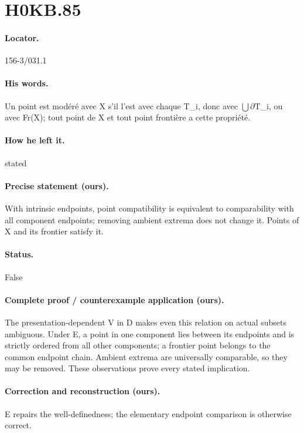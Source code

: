 \section*{H0KB.85}\label{statement:H0KB.85}
\paragraph{Locator.} 156-3/031.1

\paragraph{His words.} Un point est modéré avec X s’il l’est avec chaque T\_i, donc avec \ensuremath{\bigcup}\ensuremath{\partial}T\_i, ou avec Fr(X); tout point de X et tout point frontière a cette propriété.

\paragraph{How he left it.} stated

\paragraph{Precise statement (ours).} With intrinsic endpoints, point compatibility is equivalent to comparability with all component endpoints; removing ambient extrema does not change it. Points of X and its frontier satisfy it.

\paragraph{Status.} False

\paragraph{Complete proof / counterexample application (ours).} The presentation-dependent V in D makes even this relation on actual subsets ambiguous. Under E, a point in one component lies between its endpoints and is strictly ordered from all other components; a frontier point belongs to the common endpoint chain. Ambient extrema are universally comparable, so they may be removed. These observations prove every stated implication.

\paragraph{Correction and reconstruction (ours).} E repairs the well-definedness; the elementary endpoint comparison is otherwise correct.

